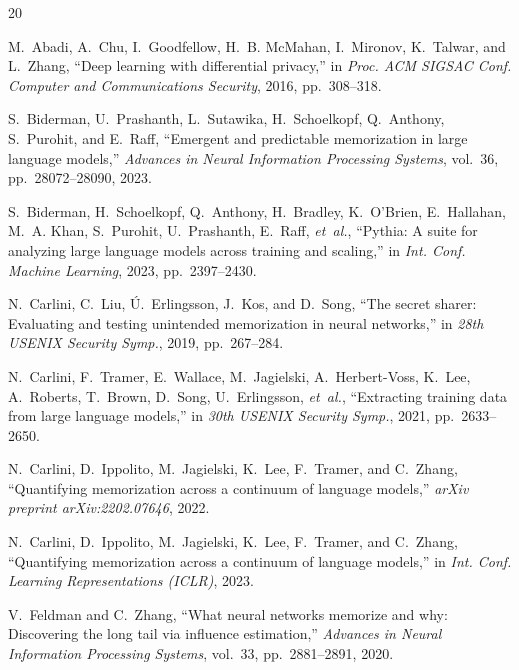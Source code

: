 \documentclass[conference]{IEEEtran}
\begin{document}


\begin{thebibliography}{20}

M.~Abadi, A.~Chu, I.~Goodfellow, H.~B. McMahan, I.~Mironov, K.~Talwar, and L.~Zhang, ``Deep learning with differential privacy,'' in \emph{Proc. ACM SIGSAC Conf. Computer and Communications Security}, 2016, pp.~308--318.

S.~Biderman, U.~Prashanth, L.~Sutawika, H.~Schoelkopf, Q.~Anthony, S.~Purohit, and E.~Raff, ``Emergent and predictable memorization in large language models,'' \emph{Advances in Neural Information Processing Systems}, vol.~36, pp.~28072--28090, 2023.

S.~Biderman, H.~Schoelkopf, Q.~Anthony, H.~Bradley, K.~O'Brien, E.~Hallahan, M.~A. Khan, S.~Purohit, U.~Prashanth, E.~Raff, \emph{et~al.}, ``Pythia: A suite for analyzing large language models across training and scaling,'' in \emph{Int. Conf. Machine Learning}, 2023, pp.~2397--2430.

N.~Carlini, C.~Liu, \'{U}.~Erlingsson, J.~Kos, and D.~Song, ``The secret sharer: Evaluating and testing unintended memorization in neural networks,'' in \emph{28th USENIX Security Symp.}, 2019, pp.~267--284.

N.~Carlini, F.~Tramer, E.~Wallace, M.~Jagielski, A.~Herbert-Voss, K.~Lee, A.~Roberts, T.~Brown, D.~Song, U.~Erlingsson, \emph{et~al.}, ``Extracting training data from large language models,'' in \emph{30th USENIX Security Symp.}, 2021, pp.~2633--2650.

N.~Carlini, D.~Ippolito, M.~Jagielski, K.~Lee, F.~Tramer, and C.~Zhang, ``Quantifying memorization across a continuum of language models,'' \emph{arXiv preprint arXiv:2202.07646}, 2022.

N.~Carlini, D.~Ippolito, M.~Jagielski, K.~Lee, F.~Tramer, and C.~Zhang, ``Quantifying memorization across a continuum of language models,'' in \emph{Int. Conf. Learning Representations (ICLR)}, 2023.

V.~Feldman and C.~Zhang, ``What neural networks memorize and why: Discovering the long tail via influence estimation,'' \emph{Advances in Neural Information Processing Systems}, vol.~33, pp.~2881--2891, 2020.


\end{thebibliography}
\end{document}
